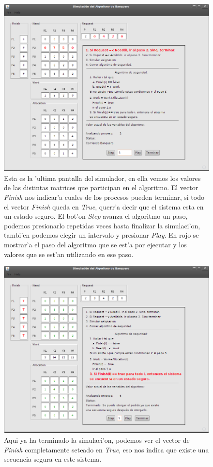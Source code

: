 \begin{figure}[h!]
\centering
 \includegraphics[scale=0.3,keepaspectratio=true]{./imagenes/banquero/banquero3.png}
 \caption{Esta es la 'ultima pantalla del simulador, en ella vemos los valores de las distintas matrices que participan en el algoritmo. El vector \emph{Finish} nos indicar'a cuales de los procesos pueden terminar, si todo el vector \emph{Finish} queda en \emph{True}, querr'a decir que el sistema esta en un estado seguro. El bot'on \emph{Step} avanza el algoritmo un paso, podemos presionarlo repetidas veces hasta finalizar la simulaci'on, tambi'en podemos elegir un intervalo y presionar \emph{Play}. En rojo se mostrar'a el paso del algoritmo que se est'a por ejecutar y los valores que se est'an utilizando en ese paso.} 
\end{figure}

\begin{figure}[h!]
\centering
 \includegraphics[scale=0.3,keepaspectratio=true]{./imagenes/banquero/banquero4.png}
 \caption{Aqui ya ha terminado la simulaci'on, podemos ver el vector de \emph{Finish} completamente seteado en \emph{True}, eso nos indica que existe una secuencia segura en este sistema.} 
\end{figure}

\newpage

